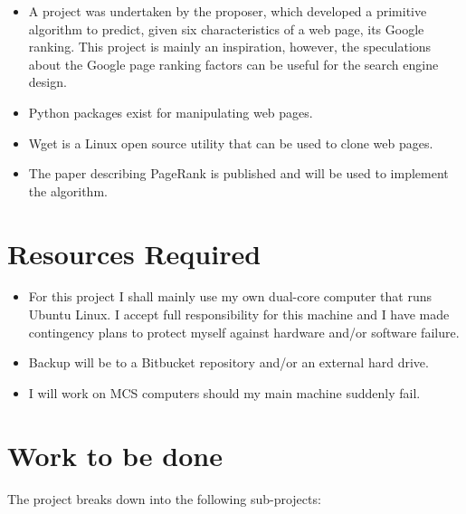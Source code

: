 \begin{itemize}
\item A project\cite{reid} was undertaken by the proposer, which developed a primitive algorithm to predict, given six characteristics of a web page, its Google ranking.  This project is mainly an inspiration, however, the speculations about the Google page ranking factors can be useful for the search engine design. 
\item Python packages exist for manipulating web pages.
\item Wget is a Linux open source utility that can be used to clone web pages.
\item The paper describing PageRank is published and will be used to implement the algorithm.
\end{itemize}


\section*{\bf Resources Required}
\begin{itemize}
\item For this project I shall mainly use my own dual-core computer that runs Ubuntu Linux. I accept full responsibility for this machine and I have made contingency plans to protect myself against hardware and/or software failure.
\item Backup will be to a Bitbucket repository and/or an external hard drive.
\item I will work on MCS computers should my main machine suddenly fail. 
\end{itemize}
\section*{\bf Work to be done}

The project breaks down into the following sub-projects:


